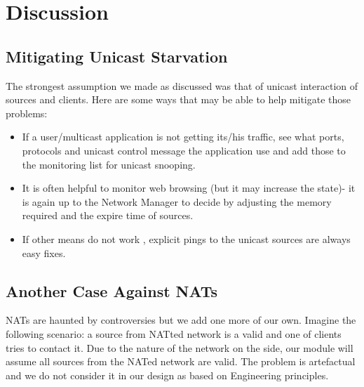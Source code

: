 \chapter{Discussion}
\section{Mitigating Unicast Starvation}
The strongest assumption we made as discussed was that of unicast interaction
of sources and clients. Here are some ways that may be able to help mitigate those
problems:
\begin{itemize}
\item If a user/multicast application is not getting its/his traffic, see what ports,
protocols and unicast control message the application use and add those
to the monitoring list for unicast snooping.
\item It is often helpful to monitor web browsing (but it may increase the state)-
it is again up to the Network Manager to decide by adjusting the memory
required and the expire time of sources.
\item If other means do not work , explicit pings to the unicast sources are
always easy fixes.
\end{itemize}
\section{Another Case Against NATs}
NATs are haunted by controversies but we add one more of our own. Imagine
the following scenario: a source from NATted network is a valid and one of clients
tries to contact it. Due to the nature of the network on the side, our module will
assume all sources from the NATed network are valid. The problem is artefactual
and we do not consider it in our design as based on Engineering principles.
